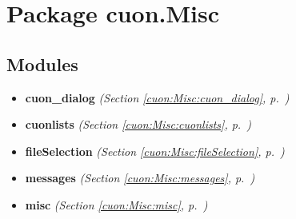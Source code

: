 %
%
%


\section{Package cuon.Misc}

    \label{cuon:Misc}


\subsection{Modules}

\begin{itemize}
\setlength{\parskip}{0ex}
\item \textbf{cuon\_dialog}
  \textit{(Section \ref{cuon:Misc:cuon_dialog}, p.~\pageref{cuon:Misc:cuon_dialog})}

\item \textbf{cuonlists}
  \textit{(Section \ref{cuon:Misc:cuonlists}, p.~\pageref{cuon:Misc:cuonlists})}

\item \textbf{fileSelection}
  \textit{(Section \ref{cuon:Misc:fileSelection}, p.~\pageref{cuon:Misc:fileSelection})}

\item \textbf{messages}
  \textit{(Section \ref{cuon:Misc:messages}, p.~\pageref{cuon:Misc:messages})}

\item \textbf{misc}
  \textit{(Section \ref{cuon:Misc:misc}, p.~\pageref{cuon:Misc:misc})}

\end{itemize}



